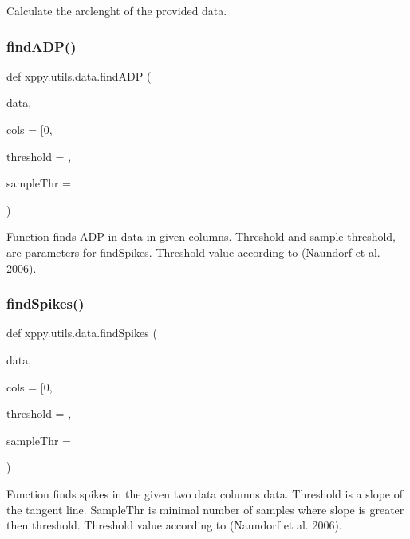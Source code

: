 \begin{DoxyVerb}Calculate the arclenght of the provided data.
\end{DoxyVerb}
 \mbox{\label{namespacexppy_1_1utils_1_1data_a585f17a25e7dcefc06dd2476644fed6a}} 
\subsubsection{\texorpdfstring{find\+A\+D\+P()}{findADP()}}
{\footnotesize\ttfamily def xppy.\+utils.\+data.\+find\+A\+DP (\begin{DoxyParamCaption}\item[{}]{data,  }\item[{}]{cols = {\ttfamily \mbox{[}0},  }\item[{}]{threshold = {},  }\item[{}]{sample\+Thr = {} }\end{DoxyParamCaption})}

\begin{DoxyVerb}Function finds ADP in data in given columns. Threshold and sample threshold,
are parameters for findSpikes.
Threshold value according to (Naundorf et al. 2006).
\end{DoxyVerb}
 \mbox{\label{namespacexppy_1_1utils_1_1data_ab759be682464d135b9aff86a1ed5b5bf}} 
\subsubsection{\texorpdfstring{find\+Spikes()}{findSpikes()}}
{\footnotesize\ttfamily def xppy.\+utils.\+data.\+find\+Spikes (\begin{DoxyParamCaption}\item[{}]{data,  }\item[{}]{cols = {\ttfamily \mbox{[}0},  }\item[{}]{threshold = {},  }\item[{}]{sample\+Thr = {} }\end{DoxyParamCaption})}

\begin{DoxyVerb}Function finds spikes in the given two data columns data. 
Threshold is a slope of the tangent line. SampleThr is 
minimal number of samples where slope is greater then threshold.
Threshold value according to (Naundorf et al. 2006).
\end{DoxyVerb}
 \mbox{\label{namespacexppy_1_1utils_1_1data_aeab79029ca4d8b88427aef50e2b7ead1}} 
